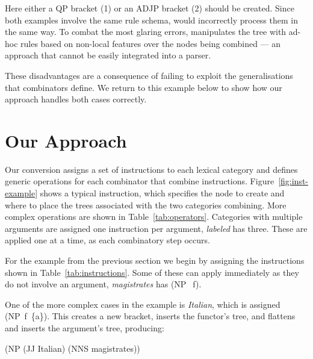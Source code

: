 Here either a QP bracket (1) or an ADJP bracket (2) should be created.  Since
both examples involve the same rule schema, \old would incorrectly process them
in the same way.  To combat the most glaring errors, \old manipulates the \ptb
tree with ad-hoc rules based on non-local features over the \ccg nodes
being combined --- an approach that cannot be easily integrated into a
parser.

These disadvantages are a consequence of failing to exploit the generalisations
that \ccg combinators define.  We return to this example below to show how our
approach handles both cases correctly.

\section{Our Approach}

Our conversion assigns a set of instructions to each lexical category and
defines generic operations for each combinator that combine instructions.
Figure~\ref{fig:inst-example} shows a typical instruction, which specifies the
node to create and where to place the \ptb trees associated with the two
categories combining.  More complex operations are shown in
Table~\ref{tab:operators}.  Categories with multiple arguments are assigned one
instruction per argument, \myeg \textit{labeled} has three.  These are applied
one at a time, as each combinatory step occurs.

For the example from the previous section we begin by assigning the
instructions shown in Table~\ref{tab:instructions}.  Some of these can apply
immediately as they do not involve an argument, \myeg \textit{magistrates} has (NP$\;$~f).

One of the more complex cases in the example is \textit{Italian}, which is
assigned (NP~f~\{a\}). This creates a new bracket, inserts the functor's tree, and
flattens and inserts the argument's tree, producing:

\vspace{1mm}
{\footnotesize
(NP (JJ Italian) (NNS magistrates))
}
\vspace{1mm}



